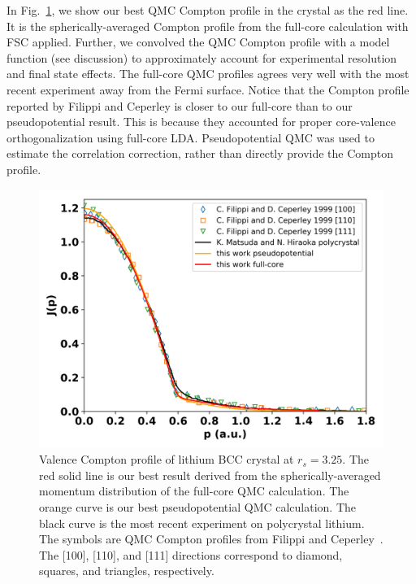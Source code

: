 \documentclass[aps,prb,showpacs,preprintnumbers,amsmath,amssymb,superscriptaddress,twocolumn]{revtex4}
\begin{document}
In Fig.~\ref{fig:crystal-vcp}, we show our best QMC Compton profile in the crystal as the red line. It is the spherically-averaged Compton profile from the full-core calculation with FSC applied. Further, we convolved the QMC Compton profile with a model function (see discussion) to approximately account for experimental resolution and final state effects. The full-core QMC profiles agrees very well with the most recent experiment away from the Fermi surface.
Notice that the Compton profile reported by Filippi and Ceperley \cite{Filippi1999} is closer to our full-core than to our pseudopotential result. This is because they accounted for proper core-valence orthogonalization using full-core LDA. Pseudopotential QMC was used to estimate the correlation correction, rather than directly provide the Compton profile.

\begin{figure}
\includegraphics[scale=0.48]{figures/li40_fc7-vcp}
\caption{Valence Compton profile of lithium BCC crystal at $r_s=3.25$. The red solid line is our best result derived from the spherically-averaged momentum distribution of the full-core QMC calculation. The orange curve is our best pseudopotential QMC calculation. The black curve is the most recent experiment on polycrystal lithium. The symbols are QMC Compton profiles from Filippi and Ceperley~\cite{Filippi1999}. The [100], [110], and [111] directions correspond to diamond, squares, and triangles, respectively.\label{fig:crystal-vcp}}
\end{figure}
\end{document}
